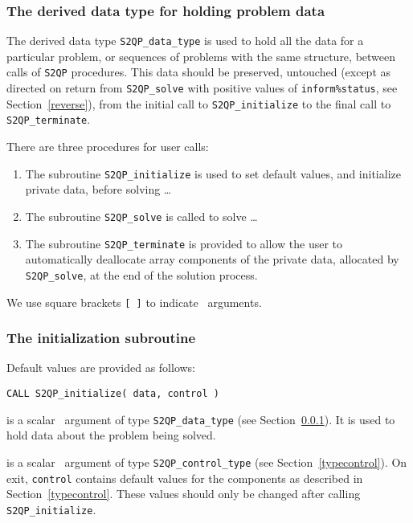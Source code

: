 \documentclass{galahad}
\newcommand{\packagename}{S2QP}
\begin{document}

\subsubsection{The derived data type for holding problem data}\label{typedata}
The derived data type
{\tt \packagename\_data\_type}
is used to hold all the data for a particular problem,
or sequences of problems with the same structure, between calls of
{\tt \packagename} procedures.
This data should be preserved, untouched (except as directed on
return from {\tt \packagename\_solve} with positive values of
{\tt inform\%status}, see Section~\ref{reverse}),
from the initial call to
{\tt \packagename\_initialize}
to the final call to
{\tt \packagename\_terminate}.


\galarguments
There are three procedures for user calls:

\begin{enumerate}
\item The subroutine
      {\tt \packagename\_initialize}
      is used to set default values, and initialize private data,
      before solving \ldots
\item The subroutine
      {\tt \packagename\_solve}
      is called to solve \ldots
\item The subroutine
      {\tt \packagename\_terminate}
      is provided to allow the user to automatically deallocate array
       components of the private data, allocated by
       {\tt \packagename\_solve},
       at the end of the solution process.
\end{enumerate}
We use square brackets {\tt [ ]} to indicate \optional\ arguments.


\subsubsection{The initialization subroutine}\label{subinit}
 Default values are provided as follows:
\vspace*{1mm}

\hspace{8mm}
{\tt CALL \packagename\_initialize( data, control )}

\vspace*{-3mm}
\begin{description}

 is a scalar \intentinout\ argument of type
{\tt \packagename\_data\_type}
(see Section~\ref{typedata}). It is used to hold data about the problem being
solved.

 is a scalar \intentout\ argument of type
{\tt \packagename\_control\_type}
(see Section~\ref{typecontrol}).
On exit, {\tt control} contains default values for the components as
described in Section~\ref{typecontrol}.
These values should only be changed after calling
{\tt \packagename\_initialize}.

\end{description}
\end{document}
